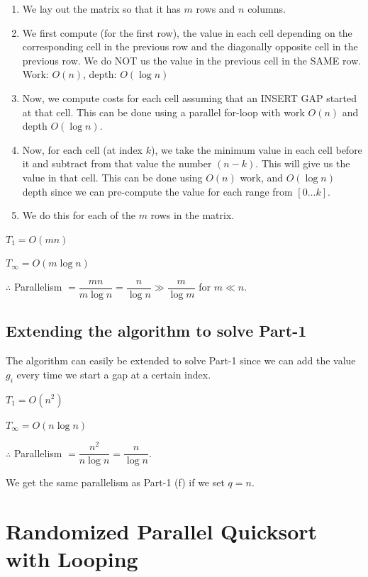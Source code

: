 \documentclass{article}
\begin{document}
\begin{enumerate}

\item We lay out the matrix so that it has $m$ rows and $n$ columns.

\item We first compute (for the first row), the value in each cell
  depending on the corresponding cell in the previous row and the
  diagonally opposite cell in the previous row. We do NOT us the value
  in the previous cell in the SAME row. Work: $O(n)$, depth: $O(\log{n})$

\item Now, we compute costs for each cell assuming that an INSERT GAP
  started at that cell. This can be done using a parallel for-loop
  with work $O(n)$ and depth $O(\log{n})$.

\item Now, for each cell (at index $k$), we take the minimum value in
  each cell before it and subtract from that value the number
  $(n-k)$. This will give us the value in that cell. This can be done
  using $O(n)$ work, and $O(\log{n})$ depth since we can pre-compute
  the value for each range from $[0 \ldots{} k]$.

\item We do this for each of the $m$ rows in the matrix.

\end{enumerate}

$T_1 = O(mn)$

$T_{\infty} = O(m\log{n})$

$\therefore$ Parallelism $= \dfrac{mn}{m\log{n}} = \dfrac{n}{\log{n}} \gg \dfrac{m}{\log{m}}$ for $m \ll n$.

\subsection{Extending the algorithm to solve Part-1}

The algorithm can easily be extended to solve Part-1 since we can add
the value $g_i$ every time we start a gap at a certain index.

$T_1 = O(n^2)$

$T_{\infty} = O(n\log{n})$

$\therefore$ Parallelism $= \dfrac{n^2}{n\log{n}} = \dfrac{n}{\log{n}}$.

We get the same parallelism as Part-1 (f) if we set $q = n$.

\clearpage

\section{Randomized Parallel Quicksort with Looping}
\end{document}
